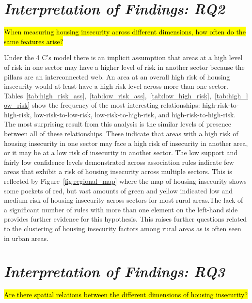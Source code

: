 \section{\textit{Interpretation of Findings: RQ2}}

\hl{When measuring housing insecurity across different dimensions, how often do the same features arise?}

Under the 4 C's model there is an implicit assumption that areas at a high level of risk in one sector may have a higher level of risk in another sector because the pillars are an interconnected web. An area at an overall high risk of housing insecurity would at least have a high-risk level across more than one sector. Tables~\ref{tab:high_risk_ass},~\ref{tab:low_risk_ass},~\ref{tab:low_high_risk},~\ref{tab:high_low_risk} show the frequency of the most interesting relationships: high-risk-to-high-risk, low-risk-to-low-risk, low-risk-to-high-risk, and high-risk-to-high-risk. The most surprising result from this analysis is the similar levels of presence between all of these relationships. These indicate that areas with a high risk of housing insecurity in one sector may face a high risk of insecurity in another area, or it may be at a low risk of insecurity in another sector. The low support and fairly low confidence levels demonstrated across association rules indicate few areas that exhibit a risk of housing insecurity across multiple sectors. This is reflected by Figure~\ref{fig:regional_map} where the map of housing insecurity shows some pockets of red, but vast amounts of green and yellow indicated low and medium risk of housing insecurity across sectors for most rural areas.The lack of a significant number of rules with more than one element on the left-hand side provides further evidence for this hypothesis. This raises further questions related to the clustering of housing insecurity factors among rural areas as is often seen in urban areas. 

\section{\textit{Interpretation of Findings: RQ3}}

\hl{Are there spatial relations between the different dimensions of housing insecurity? }

